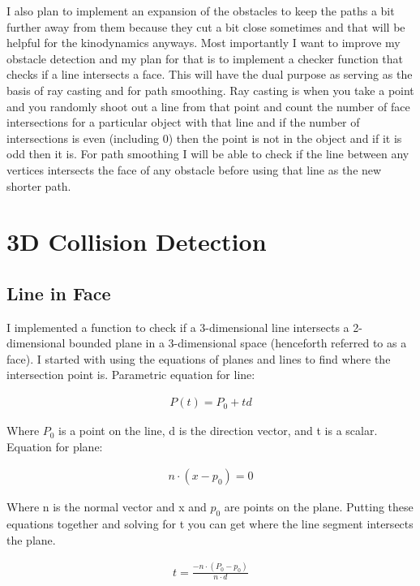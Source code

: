 \documentclass{article}
\begin{document}
I also plan to implement an expansion of the obstacles to keep the paths a bit further away from them because they cut a bit close sometimes and that will be helpful for the kinodynamics anyways.
Most importantly I want to improve my obstacle detection and my plan for that is to implement a checker function that checks if a line intersects a face.
This will have the dual purpose as serving as the basis of ray casting and for path smoothing.
Ray casting is when you take a point and you randomly shoot out a line from that point and count the number of face intersections for a particular object with that line and if the number of intersections is even (including 0) then the point is not in the object and if it is odd then it is.
For path smoothing I will be able to check if the line between any vertices intersects the face of any obstacle before using that line as the new shorter path.

\section*{3D Collision Detection}

\subsection*{Line in Face}

I implemented a function to check if a 3-dimensional line intersects a 2-dimensional bounded plane in a 3-dimensional space (henceforth referred to as a face).
I started with using the equations of planes and lines to find where the intersection point is.
Parametric equation for line:

\begin{align*}
    P(t) = P_0 + td
\end{align*}

Where $P_0$ is a point on the line, d is the direction vector, and t is a scalar.
Equation for plane:

\begin{align*}
    n \cdot (x - p_0) = 0 
\end{align*}

Where n is the normal vector and x and $p_0$ are points on the plane.
Putting these equations together and solving for t you can get where the line segment intersects the plane.

\begin{align*}
    t = \frac{-n \cdot (P_0 - p_0)}{n \cdot d}
\end{align*}
\end{document}
